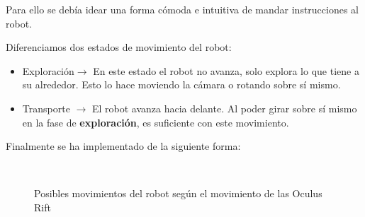 \documentclass[twoside, 11pt]{epstfg}
\begin{document}
Para ello se debía idear una forma cómoda e intuitiva de mandar instrucciones al robot.

Diferenciamos dos estados de movimiento del robot:
\begin{itemize}
	\item Exploración$\rightarrow$ En este estado el robot no avanza, solo explora lo que tiene a su alrededor. Esto lo hace moviendo la cámara o rotando sobre sí mismo.
	\item Transporte $\rightarrow$ El robot avanza hacia delante. Al poder girar sobre sí mismo en la fase de \textbf{exploración}, es suficiente con este movimiento.
\end{itemize}

Finalmente se ha implementado de la siguiente forma:


\begin{figure}[H]
	\centering
	\\
	\caption{Posibles movimientos del robot según el movimiento de las Oculus Rift} \label{movRobot}
\end{figure}
\end{document}
